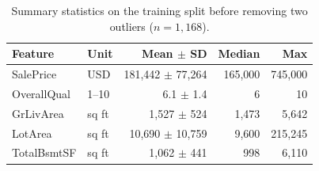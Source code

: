 \begin{table}[t]
\centering
\small
\setlength{\tabcolsep}{3pt}
\begin{tabular}{@{}l l r r r@{}}
\toprule
\textbf{Feature} & \textbf{Unit} & \textbf{Mean $\pm$ SD} & \textbf{Median} & \textbf{Max} \\
\midrule
SalePrice   & USD     & 181{,}442 $\pm$ 77{,}264 & 165{,}000 & 745{,}000 \\
OverallQual & 1--10   & 6.1 $\pm$ 1.4            & 6         & 10 \\
GrLivArea   & sq ft   & 1{,}527 $\pm$ 524        & 1{,}473   & 5{,}642 \\
LotArea     & sq ft   & 10{,}690 $\pm$ 10{,}759  & 9{,}600   & 215{,}245 \\
TotalBsmtSF & sq ft   & 1{,}062 $\pm$ 441        & 998       & 6{,}110 \\
\bottomrule
\end{tabular}
\caption{Summary statistics on the training split before removing two outliers ($n = 1{,}168$).}
\label{tab:data}
\end{table}
